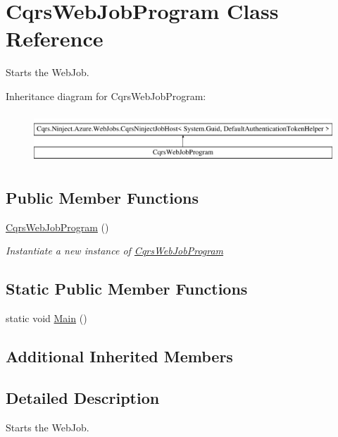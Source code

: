 \hypertarget{classCqrsWebJobProgram}{}\section{Cqrs\+Web\+Job\+Program Class Reference}
\label{classCqrsWebJobProgram}


Starts the Web\+Job.  


Inheritance diagram for Cqrs\+Web\+Job\+Program\+:\begin{figure}[H]
\begin{center}
\leavevmode
\includegraphics[height=1.888702cm]{classCqrsWebJobProgram}
\end{center}
\end{figure}
\subsection*{Public Member Functions}
\begin{DoxyCompactItemize}
\item 
\hyperlink{classCqrsWebJobProgram_aef553539b5ec25d0cdb061fd9895c851_aef553539b5ec25d0cdb061fd9895c851}{Cqrs\+Web\+Job\+Program} ()
\begin{DoxyCompactList}\small\item\em Instantiate a new instance of \hyperlink{classCqrsWebJobProgram}{Cqrs\+Web\+Job\+Program} \end{DoxyCompactList}\end{DoxyCompactItemize}
\subsection*{Static Public Member Functions}
\begin{DoxyCompactItemize}
\item 
static void \hyperlink{classCqrsWebJobProgram_ab11d66be0194de537cb7ae73e74c2181_ab11d66be0194de537cb7ae73e74c2181}{Main} ()
\end{DoxyCompactItemize}
\subsection*{Additional Inherited Members}


\subsection{Detailed Description}
Starts the Web\+Job. 



